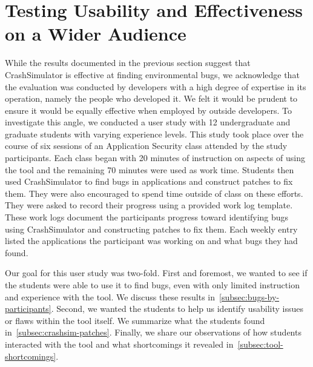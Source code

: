 \chapter{Testing Usability and Effectiveness on a Wider Audience}
\label{chap:userstudy}

While the results documented in the previous section suggest that CrashSimulator
is effective at finding environmental bugs, we acknowledge that the evaluation
was conducted by developers with a high degree of expertise in its operation,
namely the people who developed it.  We felt it would be prudent to ensure it
would be equally effective when employed by outside developers.
To investigate this angle,
we conducted a user study
with 12 undergraduate and graduate students with varying experience levels.
This study took place over the course of six sessions
of an Application Security class attended by the study participants.
Each class began with 20
minutes of instruction on aspects of using the tool
and the remaining 70 minutes were used as work time. Students then used
CrashSimulator to find bugs in applications and construct patches to fix
them.  They were also encouraged to spend time outside
of class on these efforts.  They were asked to record their progress
using a provided work log template.  These work logs document the participants
progress toward identifying bugs using CrashSimulator and constructing patches
to fix them.  Each weekly entry listed the applications the participant was
working on and what bugs they had found.

Our goal for this user study was two-fold.  First and foremost,
we wanted to see if the students were able to use it to find bugs,
even with only limited instruction and experience with the tool.
We discuss these results in~\ref{subsec:bugs-by-participants}.
Second, we wanted the students to help us identify usability issues
or flaws within the tool itself.  We summarize what the students found
in~\ref{subsec:crashsim-patches}.  Finally, we share our observations
of how students interacted with the tool and what shortcomings
it revealed in~\ref{subsec:tool-shortcomings}.

